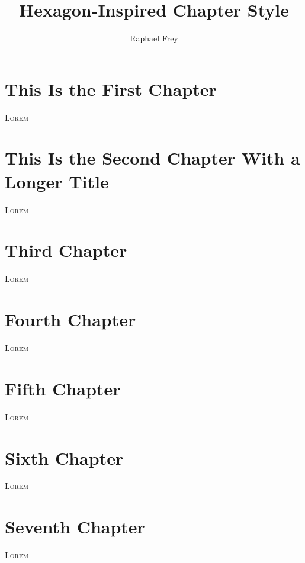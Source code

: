 \documentclass[a4paper,oneside,11pt]{memoir}
\title{Hexagon-Inspired Chapter Style}
\author{Raphael Frey}
\begin{document}

\begin{titlingpage}
    \maketitle
\end{titlingpage}

\frontmatter
\begin{abstract}
    \lipsum[1-2]
\end{abstract}
\newpage
\tableofcontents*

\mainmatter
\chapter{This Is the First Chapter}
\lettrine{\textcolor[gray]{0.5}{L}}{orem} \lipsum[1-3]

\chapter{This Is the Second Chapter With a Longer Title}
\lettrine{\textcolor[gray]{0.5}{L}}{orem} \lipsum[1-2]

\chapter{Third Chapter}
\lettrine{\textcolor[gray]{0.5}{L}}{orem} \lipsum[1-3]

\chapter{Fourth Chapter}
\lettrine{\textcolor[gray]{0.5}{L}}{orem} \lipsum[1-3]

\chapter{Fifth Chapter}
\lettrine{\textcolor[gray]{0.5}{L}}{orem} \lipsum[1-3]

\chapter{Sixth Chapter}
\lettrine{\textcolor[gray]{0.5}{L}}{orem} \lipsum[1-3]

\chapter{Seventh Chapter}
\lettrine{\textcolor[gray]{0.5}{L}}{orem} \lipsum[1-3]
\end{document}

